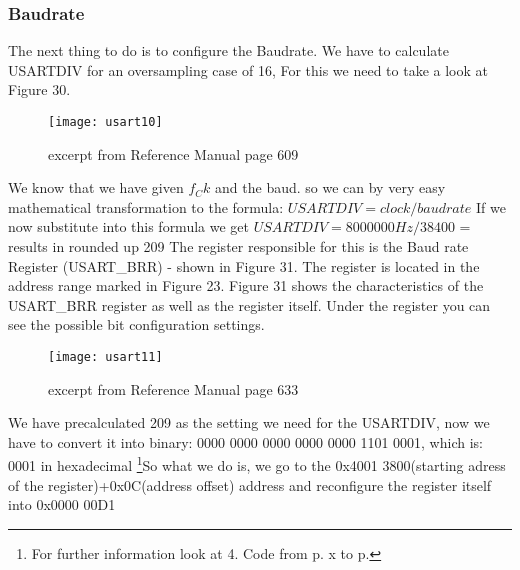 \documentclass[11pt]{scrartcl}
\begin{document}
	\subsubsection{Baudrate}
The next thing to do is to configure the Baudrate. We have to calculate USARTDIV for an oversampling case of 16, For this we need to take a look at Figure 30.  
\begin{figure}[h]
		\centering
		\texttt{[image: usart10]}
		\caption{excerpt from Reference Manual page 609}
\end{figure}
\newline
We know that we have given $f_Ck$ and the baud. so we can by very easy mathematical transformation to the formula: \(USARTDIV = clock / baudrate\) If we now substitute into this formula we get \(USARTDIV = 8 000 000 Hz / 38400\) = results in rounded up 209
\newline\newline
The register responsible for this is the Baud rate Register (USART\_BRR) - shown in Figure 31. The register is located in the address range marked in Figure 23. Figure 31 shows the characteristics of the USART\_BRR register as well as the register itself. Under the register you can see the possible bit configuration settings.
\begin{figure}[h]
		\centering
		\texttt{[image: usart11]}
		\caption{excerpt from Reference Manual page 633}
\end{figure}
\newline
We have precalculated 209 as the setting we need for the USARTDIV, now we have to convert it into binary: 0000 0000 0000 0000 0000 1101 0001, which is: 0001 in hexadecimal
\newline\newline
\footnote{\label{foot:23}For further information look at 4. Code from p. x to p.}So what we do is, we go to the 0x4001 3800(starting adress of the register)+0x0C(address offset) address and reconfigure the register itself into 0x0000 00D1



\newpage
\end{document}
